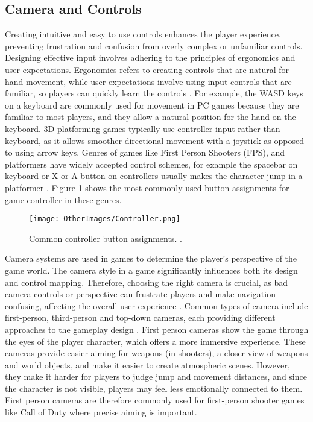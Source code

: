 \documentclass[10pt]{final_report}
\begin{document}
\subsection{Camera and Controls}
Creating intuitive and easy to use controls enhances the player experience, preventing frustration and confusion from overly complex or unfamiliar controls. Designing effective input involves adhering to the principles of ergonomics and user expectations. Ergonomics refers to creating controls that are natural for hand movement, while user expectations involve using input controls that are familiar, so players can quickly learn the controls \cite{Rogers2014}. For example, the WASD keys on a keyboard are commonly used for movement in PC games because they are familiar to most players, and they allow a natural position for the hand on the keyboard. 3D platforming games typically use controller input rather than keyboard, as it allows smoother directional movement with a joystick as opposed to using arrow keys. Genres of games like First Person Shooters (FPS), and platformers have widely accepted control schemes, for example the spacebar on keyboard or X or A button on controllers usually makes the character jump in a platformer \cite{Rogers2014}. Figure \ref{fig:Controller} shows the most commonly used button assignments for game controller in these genres. \newline
\begin{figure}[H]
    \centering
    \texttt{[image: OtherImages/Controller.png]}
    \caption{Common controller button assignments. \cite{Rogers2014}.}
    \label{fig:Controller}
\end{figure}
Camera systems are used in games to determine the player's perspective of the game world. The camera style in a game significantly influences both its design and control mapping. Therefore, choosing the right camera is crucial, as bad camera controls or perspective can frustrate players and make navigation confusing, affecting the overall user experience \cite{Rogers2014}.
\newline
Common types of camera include first-person, third-person and top-down cameras, each providing different approaches to the gameplay design \cite{Kramarzewski2023}. First person cameras show the game through the eyes of the player character, which offers a more immersive experience. These cameras provide easier aiming for weapons (in shooters), a closer view of weapons and world objects, and make it easier to create atmospheric scenes. However, they make it harder for players to judge jump and movement distances, and since the character is not visible, players may feel less emotionally connected to them. First person cameras are therefore commonly used for first-person shooter games like Call of Duty where precise aiming is important.
\end{document}
